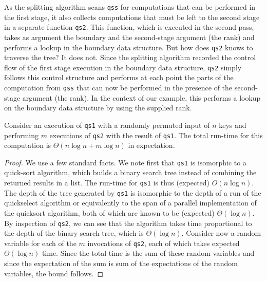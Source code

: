 \begin{abstrsyn}
As the splitting algorithm scans \texttt{qss} for computations that
can be performed in the first stage, it also collects computations
that must be left to the second stage in a separate function
\texttt{qs2}.  This function, which is executed in the second pass,
takes as argument the boundary and the second-stage argument (the
rank) and performs a lookup in the boundary data structure.  But how
does \texttt{qs2} knows to traverse the tree? It does not. Since
the splitting algorithm recorded the control flow of the first stage
execution in the boundary data structure, \texttt{qs2} simply follows
this control structure and performs at each point the parts of the
computation from \texttt{qss} that can now be performed in the
presence of the second-stage argument (the rank).  In the context of
our example, this performs a lookup on the boundary data structure by
using the supplied rank.

\begin{theorem}
  Consider an execution of \texttt{qs1} with a randomly permuted input
  of $n$ keys and performing $m$ executions of \texttt{qs2} with the
  result of \texttt{qs1}.  The total run-time for this computation is
  $\Theta(n\log{n} + m\log{n})$ in expectation.
\end{theorem}
\begin{proof}
  We use a few standard facts.  We note first that \texttt{qs1} is
  isomorphic to a quick-sort algorithm, which builds a binary search
  tree instead of combining the returned results in a list.  The
  run-time for \texttt{qs1} is thus (expected) $O(n\log{n})$. 
%
  The depth of the tree generated by \texttt{qs1} is isomorphic to the
    depth of a run of the quickselect algorithm or equivalently to the
    span of a parallel implementation of the quicksort algorithm, both
    of which are known to be (expected) $\Theta(\log{n})$.
%
    By inspection of \texttt{qs2}, we can see that the algorithm takes
    time proportional to the depth of the binary search tree, which is
    $\Theta(\log{n})$. Consider now a random variable for each of the
    $m$ invocations of \texttt{qs2}, each of which takes expected
    $\Theta(\log{n})$ time.  Since the total time is the sum of these
    random variables and since the expectation of the sum is sum of
    the expectations of the random variables, the bound follows.
\end{proof}

\begin{comment}

An astute programmer, having noticed that \texttt{quickselect} can be staged in
this fashion, might try to split it into a pair of functions, one which performs
all the work depending only on \texttt{l} (the first stage), and one which uses
that partial result and \texttt{k} to compute the element with
rank \texttt{k} in \texttt{l}. 


\end{comment}
\end{abstrsyn}
